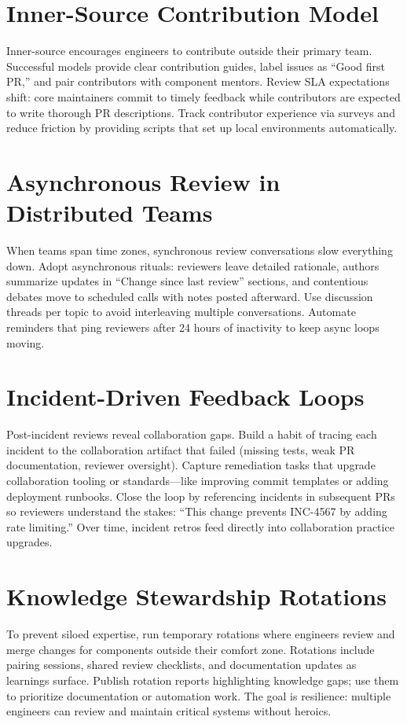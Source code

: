 \section{Inner-Source Contribution Model}
Inner-source encourages engineers to contribute outside their primary team. Successful models provide clear contribution guides, label issues as ``Good first PR,'' and pair contributors with component mentors. Review SLA expectations shift: core maintainers commit to timely feedback while contributors are expected to write thorough PR descriptions. Track contributor experience via surveys and reduce friction by providing scripts that set up local environments automatically.

\section{Asynchronous Review in Distributed Teams}
When teams span time zones, synchronous review conversations slow everything down. Adopt asynchronous rituals: reviewers leave detailed rationale, authors summarize updates in ``Change since last review'' sections, and contentious debates move to scheduled calls with notes posted afterward. Use discussion threads per topic to avoid interleaving multiple conversations. Automate reminders that ping reviewers after 24 hours of inactivity to keep async loops moving.

\section{Incident-Driven Feedback Loops}
Post-incident reviews reveal collaboration gaps. Build a habit of tracing each incident to the collaboration artifact that failed (missing tests, weak PR documentation, reviewer oversight). Capture remediation tasks that upgrade collaboration tooling or standards---like improving commit templates or adding deployment runbooks. Close the loop by referencing incidents in subsequent PRs so reviewers understand the stakes: ``This change prevents INC-4567 by adding rate limiting.'' Over time, incident retros feed directly into collaboration practice upgrades.

\section{Knowledge Stewardship Rotations}
To prevent siloed expertise, run temporary rotations where engineers review and merge changes for components outside their comfort zone. Rotations include pairing sessions, shared review checklists, and documentation updates as learnings surface. Publish rotation reports highlighting knowledge gaps; use them to prioritize documentation or automation work. The goal is resilience: multiple engineers can review and maintain critical systems without heroics.

